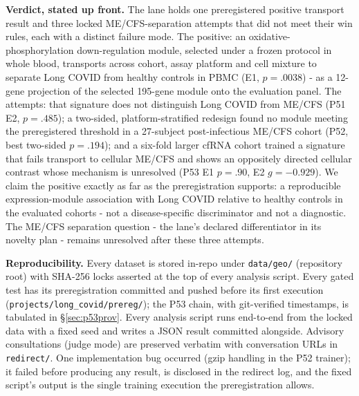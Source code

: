 \documentclass[11pt,a4paper]{article}
\begin{document}
\textbf{Verdict, stated up front.} The lane holds one preregistered positive
transport result and three locked ME/CFS-separation attempts that did not
meet their win rules, each with a distinct failure mode. The positive: an
oxidative-phosphorylation down-regulation module, selected under a frozen
protocol in whole blood, transports across cohort, assay platform and cell
mixture to separate Long COVID from healthy controls in PBMC (E1, $p=.0038$)
- as a 12-gene projection of the selected 195-gene module onto the evaluation
panel. The attempts: that signature does not distinguish Long COVID from
ME/CFS (P51 E2, $p=.485$); a two-sided, platform-stratified redesign found no
module meeting the preregistered threshold in a 27-subject post-infectious
ME/CFS cohort (P52, best two-sided $p=.194$); and a six-fold larger cfRNA
cohort trained a signature that fails transport to cellular ME/CFS and shows
an oppositely directed cellular contrast whose mechanism is unresolved (P53
E1 $p=.90$, E2 $g=-0.929$). We claim the positive exactly as far as the
preregistration supports: a reproducible expression-module association with
Long COVID relative to healthy controls in the evaluated cohorts - not a
disease-specific discriminator and not a diagnostic. The ME/CFS separation
question - the lane's declared differentiator in its novelty plan - remains
unresolved after these three attempts.

\textbf{Reproducibility.} Every dataset is stored in-repo under
\texttt{data/geo/} (repository root) with SHA-256 locks asserted at the top
of every analysis script. Every gated test has its preregistration committed
and pushed before its first execution
(\texttt{projects/long\_covid/prereg/}); the P53 chain, with git-verified
timestamps, is tabulated in \S\ref{sec:p53prov}. Every analysis
script runs end-to-end from the locked data with a fixed seed and writes a
JSON result committed alongside. Advisory consultations (judge mode) are
preserved verbatim with conversation URLs in \texttt{redirect/}. One
implementation bug occurred (gzip handling in the P52 trainer); it failed
before producing any result, is disclosed in the redirect log, and the fixed
script's output is the single training execution the preregistration allows.
\end{document}
